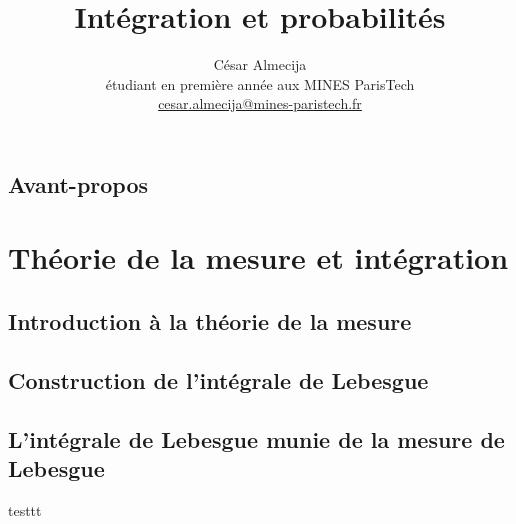 \documentclass[french]{report}
\theoremstyle{plain}
\theoremstyle{definition}
\theoremstyle{remark}
\begin{document}
\title{Intégration et probabilités}

\author{César Almecija
\\ étudiant en première année aux MINES ParisTech
\\ \href{mailto:cesar.almecija@mines-paristech.fr}{cesar.almecija@mines-paristech.fr}}

\maketitle

\tableofcontents

\chapter*{Avant-propos}



\part{Théorie de la mesure et intégration}

\chapter{Introduction à la théorie de la mesure}



\chapter{Construction de l'intégrale de Lebesgue}



\chapter{L'intégrale de Lebesgue munie de la mesure de Lebesgue}



testtt
\end{document}
